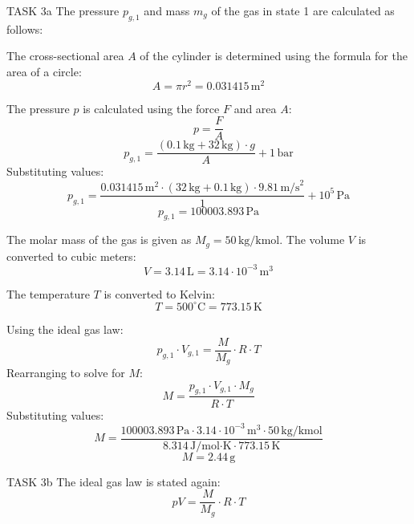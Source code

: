 TASK 3a  
The pressure \( p_{g,1} \) and mass \( m_g \) of the gas in state 1 are calculated as follows:  

The cross-sectional area \( A \) of the cylinder is determined using the formula for the area of a circle:  
\[
A = \pi r^2 = 0.031415 \, \text{m}^2
\]  

The pressure \( p \) is calculated using the force \( F \) and area \( A \):  
\[
p = \frac{F}{A}
\]  
\[
p_{g,1} = \frac{(0.1 \, \text{kg} + 32 \, \text{kg}) \cdot g}{A} + 1 \, \text{bar}
\]  
Substituting values:  
\[
p_{g,1} = \frac{0.031415 \, \text{m}^2 \cdot (32 \, \text{kg} + 0.1 \, \text{kg}) \cdot 9.81 \, \text{m/s}^2}{1} + 10^5 \, \text{Pa}
\]  
\[
p_{g,1} = 100003.893 \, \text{Pa}
\]  

The molar mass of the gas is given as \( M_g = 50 \, \text{kg/kmol} \). The volume \( V \) is converted to cubic meters:  
\[
V = 3.14 \, \text{L} = 3.14 \cdot 10^{-3} \, \text{m}^3
\]  

The temperature \( T \) is converted to Kelvin:  
\[
T = 500^\circ\text{C} = 773.15 \, \text{K}
\]  

Using the ideal gas law:  
\[
p_{g,1} \cdot V_{g,1} = \frac{M}{M_g} \cdot R \cdot T
\]  
Rearranging to solve for \( M \):  
\[
M = \frac{p_{g,1} \cdot V_{g,1} \cdot M_g}{R \cdot T}
\]  
Substituting values:  
\[
M = \frac{100003.893 \, \text{Pa} \cdot 3.14 \cdot 10^{-3} \, \text{m}^3 \cdot 50 \, \text{kg/kmol}}{8.314 \, \text{J/mol·K} \cdot 773.15 \, \text{K}}
\]  
\[
M = 2.44 \, \text{g}
\]  

TASK 3b  
The ideal gas law is stated again:  
\[
pV = \frac{M}{M_g} \cdot R \cdot T
\]